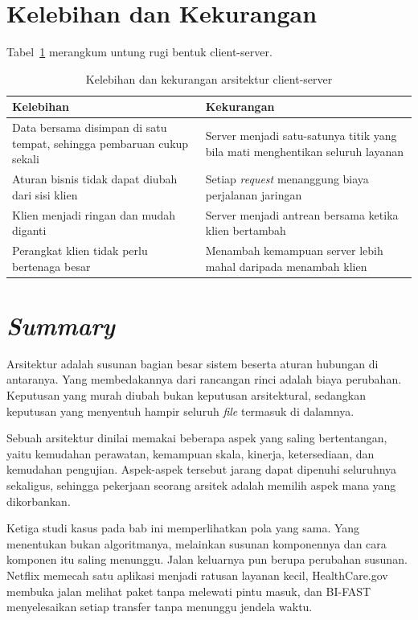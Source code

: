 \section{Kelebihan dan Kekurangan}

Tabel~\ref{tab:untung-rugi-cs} merangkum untung rugi bentuk client-server.

\begin{table}[htbp]
  \centering
  \caption{Kelebihan dan kekurangan arsitektur client-server}
  \label{tab:untung-rugi-cs}
  \begin{tabularx}{\textwidth}{|X|X|}
    \hline
    \textbf{Kelebihan} & \textbf{Kekurangan} \\
    \hline
    Data bersama disimpan di satu tempat, sehingga pembaruan cukup sekali & Server menjadi satu-satunya titik yang bila mati menghentikan seluruh layanan \\
    \hline
    Aturan bisnis tidak dapat diubah dari sisi klien & Setiap \textit{request} menanggung biaya perjalanan jaringan \\
    \hline
    Klien menjadi ringan dan mudah diganti & Server menjadi antrean bersama ketika klien bertambah \\
    \hline
    Perangkat klien tidak perlu bertenaga besar & Menambah kemampuan server lebih mahal daripada menambah klien \\
    \hline
  \end{tabularx}
\end{table}

\section{\textit{Summary}}

Arsitektur adalah susunan bagian besar sistem beserta aturan hubungan di
antaranya. Yang membedakannya dari rancangan rinci adalah biaya perubahan.
Keputusan yang murah diubah bukan keputusan arsitektural, sedangkan keputusan
yang menyentuh hampir seluruh \textit{file} termasuk di dalamnya.

Sebuah arsitektur dinilai memakai beberapa aspek yang saling bertentangan, yaitu
kemudahan perawatan, kemampuan skala, kinerja, ketersediaan, dan kemudahan
pengujian. Aspek-aspek tersebut jarang dapat dipenuhi seluruhnya sekaligus,
sehingga pekerjaan seorang arsitek adalah memilih aspek mana yang dikorbankan.

Ketiga studi kasus pada bab ini memperlihatkan pola yang sama. Yang menentukan
bukan algoritmanya, melainkan susunan komponennya dan cara komponen itu saling
menunggu. Jalan keluarnya pun berupa perubahan susunan. Netflix memecah satu
aplikasi menjadi ratusan layanan kecil, HealthCare.gov membuka jalan melihat
paket tanpa melewati pintu masuk, dan BI-FAST menyelesaikan setiap transfer
tanpa menunggu jendela waktu.

